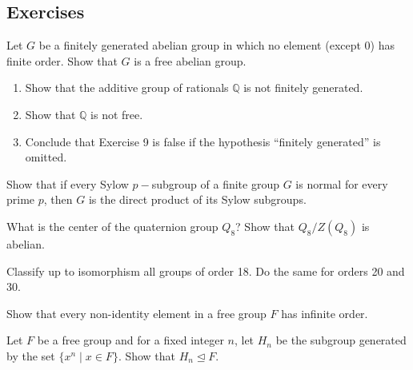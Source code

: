 \subsection{Exercises}

\begin{problem}[Hungerford 2.1.9]
\label{prob:2.1}
Let $G$ be a finitely generated abelian group in which no element (except 0) has finite order. Show that $G$ is a free abelian group. 
\end{problem}

\begin{problem}[Hungerford 2.1.10]
\label{prob:2.2} \hfill
\begin{enumerate}
    \item Show that the additive group of rationals $\mathbb Q$ is not finitely generated.
    \item Show that $\mathbb Q$ is not free.
    \item Conclude that Exercise 9 is false if the hypothesis ``finitely generated'' is omitted.
\end{enumerate}
\end{problem}

\begin{problem}[Hungerford 2.5.8]
\label{prob:2.3}
Show that if every Sylow $p-$subgroup of a finite group $G$ is normal for every prime $p$, then $G$ is the direct product of its Sylow subgroups.
\end{problem}

\begin{problem}[Hungerford 2.6.4]
\label{prob:2.4}
What is the center of the quaternion group $Q_8$? Show that $Q_8/Z(Q_8)$ is abelian.
\end{problem}

\begin{problem}[Hungerford 2.6.9]
\label{prob:2.5}
Classify up to isomorphism all groups of order 18. Do the same for orders 20 and 30.
\end{problem}

\begin{problem}[Hungerford 1.9.1]
\label{prob:2.6}
Show that every non-identity element in a free group $F$ has infinite order.
\end{problem}

\begin{problem}[Hungerford 1.9.3]
\label{prob:2.7}
Let $F$ be a free group and for a fixed integer $n$, let $H_n$ be the subgroup generated by the set $\{ x^n \mid x \in F \}$. 
Show that $H_n \trianglelefteq F$.
\end{problem}

